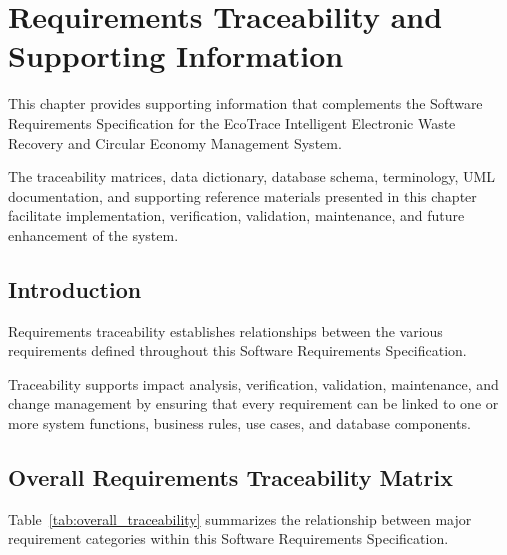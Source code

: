 \chapter{Requirements Traceability and Supporting Information}
\label{chap:traceability}

This chapter provides supporting information that complements the
Software Requirements Specification for the EcoTrace Intelligent
Electronic Waste Recovery and Circular Economy Management System.

The traceability matrices, data dictionary, database schema,
terminology, UML documentation, and supporting reference materials
presented in this chapter facilitate implementation, verification,
validation, maintenance, and future enhancement of the system.


\section{Introduction}

Requirements traceability establishes relationships between the various
requirements defined throughout this Software Requirements
Specification.

Traceability supports impact analysis, verification, validation,
maintenance, and change management by ensuring that every requirement
can be linked to one or more system functions, business rules, use
cases, and database components.

\section{Overall Requirements Traceability Matrix}

Table~\ref{tab:overall_traceability} summarizes the relationship between
major requirement categories within this Software Requirements
Specification.

